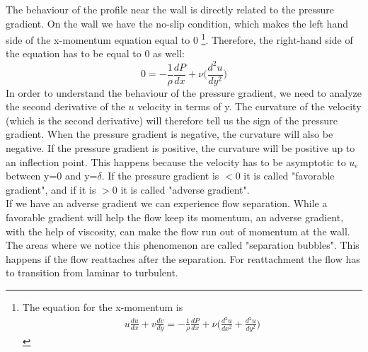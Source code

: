 \documentclass{article}
\begin{document}
The behaviour of the profile near the wall is directly related to the pressure gradient. On the wall we have the no-slip condition, which makes the left hand side of the x-momentum equation equal to 0 \footnote{The equation for the x-momentum is \begin{align*}
    u\frac{du}{dx}+v\frac{dv}{dy}=-\frac{1}{\rho}\frac{dP}{dx}+\nu\Big(\frac{d^2u}{dx^2}+\frac{d^2u}{dy^2}\Big)
\end{align*}}. Therefore, the right-hand side of the equation has to be equal to 0 as well:
\begin{equation}
    0=-\frac{1}{\rho}\frac{dP}{dx}+\nu\Big(\frac{d^2u}{dy^2}\Big)
\end{equation}
In order to understand the behaviour of the pressure gradient, we need to analyze the second derivative of the $u$ velocity in terms of y. The curvature of the velocity (which is the second derivative) will therefore tell us the sign of the pressure gradient. When the pressure gradient is negative, the curvature will also be negative. If the pressure gradient is positive, the curvature will be positive up to an inflection point. This happens because the velocity has to be asymptotic to $u_e$ between y=0 and y=$\delta$. If the pressure gradient is $<0$ it is called "favorable gradient", and if it is $>0$ it is called "adverse gradient". \\
If we have an adverse gradient we can experience flow separation. While a favorable gradient will help the flow keep its momentum, an adverse gradient, with the help of viscosity, can make the flow run out of momentum at the wall. The areas where we notice this phenomenon are called "separation bubbles". This happens if the flow reattaches after the separation. For reattachment the flow has to transition from laminar to turbulent.\\
\end{document}
